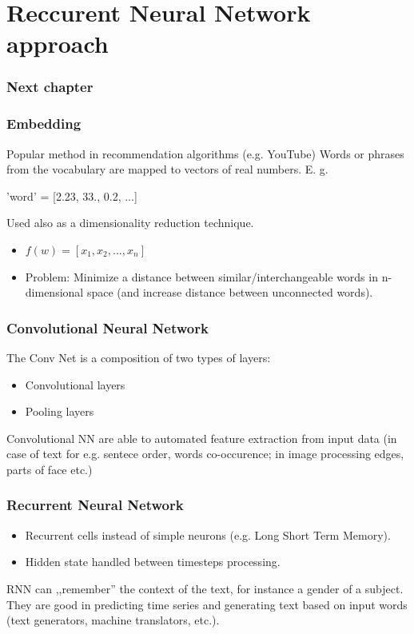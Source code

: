 \documentclass{beamer}
\begin{document}
    \section{Reccurent Neural Network approach}
    \begin{frame}
    	\frametitle{Next chapter}
        \tableofcontents[currentsection]
    \end{frame}
    \begin{frame}
        \frametitle{Embedding}
        Popular method in recommendation algorithms (e.g. YouTube)
        Words or phrases from the vocabulary are mapped to vectors of real numbers. E. g. \\
        \begin{center}
            'word' = [2.23, 33., 0.2, ...]
        \end{center}
        Used also as a dimensionality reduction technique.
        \begin{itemize}
            \item $f(w) = [x_1, x_2, ... , x_n]$
            \item Problem: Minimize a distance between similar/interchangeable words in n-dimensional space (and increase
                distance between unconnected words).
        \end{itemize}
    \end{frame}
    \begin{frame}
        \frametitle{Convolutional Neural Network}
        The Conv Net is a composition of two types of layers:
        \begin{itemize}
            \item Convolutional layers
            \item Pooling layers
        \end{itemize}
        Convolutional NN are able to automated feature extraction from input data (in case of text for e.g. sentece order, words
        co-occurence; in image processing edges, parts of face etc.)
    \end{frame}
    \begin{frame}
    	\frametitle{Recurrent Neural Network}
        \begin{itemize}
            \item Recurrent cells instead of simple neurons (e.g. Long Short Term Memory).
            \item Hidden state handled between timesteps processing.
        \end{itemize}
        RNN can ,,remember'' the context of the text, for instance a gender of a subject. \\
        They are good in predicting time series and generating text based on input words
        (text generators, machine translators, etc.).
    \end{frame}
\end{document}
